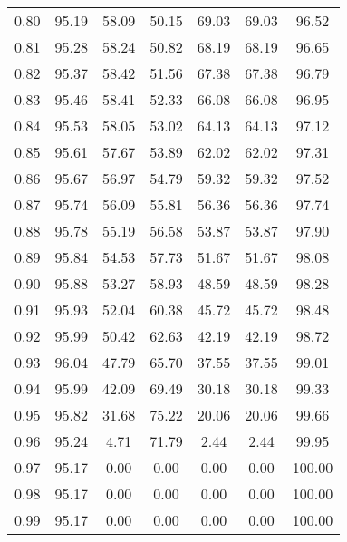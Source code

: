 \begin{tabular}{|c|c|c|c|c|c|c|}
      0.80 &     95.19 &     58.09 &      50.15 &   69.03 &      69.03 &         96.52 \\
      0.81 &     95.28 &     58.24 &      50.82 &   68.19 &      68.19 &         96.65 \\
      0.82 &     95.37 &     58.42 &      51.56 &   67.38 &      67.38 &         96.79 \\
      0.83 &     95.46 &     58.41 &      52.33 &   66.08 &      66.08 &         96.95 \\
      0.84 &     95.53 &     58.05 &      53.02 &   64.13 &      64.13 &         97.12 \\
      0.85 &     95.61 &     57.67 &      53.89 &   62.02 &      62.02 &         97.31 \\
      0.86 &     95.67 &     56.97 &      54.79 &   59.32 &      59.32 &         97.52 \\
      0.87 &     95.74 &     56.09 &      55.81 &   56.36 &      56.36 &         97.74 \\
      0.88 &     95.78 &     55.19 &      56.58 &   53.87 &      53.87 &         97.90 \\
      0.89 &     95.84 &     54.53 &      57.73 &   51.67 &      51.67 &         98.08 \\
      0.90 &     95.88 &     53.27 &      58.93 &   48.59 &      48.59 &         98.28 \\
      0.91 &     95.93 &     52.04 &      60.38 &   45.72 &      45.72 &         98.48 \\
      0.92 &     95.99 &     50.42 &      62.63 &   42.19 &      42.19 &         98.72 \\
      0.93 &     96.04 &     47.79 &      65.70 &   37.55 &      37.55 &         99.01 \\
      0.94 &     95.99 &     42.09 &      69.49 &   30.18 &      30.18 &         99.33 \\
      0.95 &     95.82 &     31.68 &      75.22 &   20.06 &      20.06 &         99.66 \\
      0.96 &     95.24 &      4.71 &      71.79 &    2.44 &       2.44 &         99.95 \\
      0.97 &     95.17 &      0.00 &       0.00 &    0.00 &       0.00 &        100.00 \\
      0.98 &     95.17 &      0.00 &       0.00 &    0.00 &       0.00 &        100.00 \\
      0.99 &     95.17 &      0.00 &       0.00 &    0.00 &       0.00 &        100.00 \\
\bottomrule
\end{tabular}
